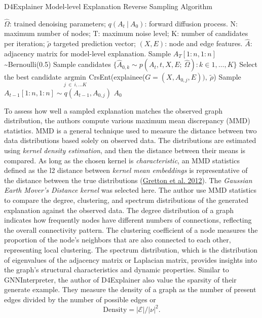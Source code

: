 \documentclass[
  11pt,
  letterpaper,
]{article}
\begin{document}
\begin{algorithm}
    \caption{D4Explainer Model-level Explanation Reverse Sampling Algorithm}\label{alg:cap}
    \begin{algorithmic}
        \Require $\hat \Omega$: trained denoising parameters; 
                $q(A_t \ | \ A_0)$: forward diffusion process.
        \renewcommand{\algorithmicrequire}{\textbf{Input:}}
        \renewcommand{\algorithmicensure}{\textbf{Output:}}
        \Require N: maximum number of nodes; T: maximum noise level; 
                K: number of candidates per iteration; 
                $\tilde{\rho}$ targeted prediction vector; 
                $(X, E)$: node and edge features.  
        \Ensure $\hat A$: adjacency matrix for model-level explanation.
        \State Sample $A_T[1:n, 1:n]$ \sim Bernoulli(0.5)
            \State Sample candidates 
                $\{\hat A_{0, k} \sim p(A_t,t, X, E; \ \hat \Omega) : k \in 1, \dots, K\}$
            \State Select the best candidate 
            $\underset{j \ \in \ i, \dots K}{\text{argmin}}$ 
            CrsEnt(explainee($G = (X, A_{0, j}, E)), \ \tilde{\rho}$)
            \State Sample $A_{t-1}[1:n, 1:n] \sim q(A_{t-1}, A_{0, j})$
        \EndFor
        \State \Return $A_0$
    \end{algorithmic}
    \end{algorithm}

\quad To assess how well a sampled explanation matches the observed
graph distribution, the authors compute various maximum mean discrepancy
(MMD) statistics. MMD is a general technique used to measure the
distance between two data distributions based solely on observed data.
The distributions are estimated using \emph{kernel density estimation},
and then the distance between their means is compared. As long as the
chosen kernel is \emph{characteristic}, an MMD statistics defined as the
l2 distance between \emph{kernel mean embeddings} is representative of
the distance between the true distributions
(\protect\hyperlink{ref-Gretton_Borgwardt_Rasch_Schuxf6lkopf_Smola_2012}{Gretton
et al. 2012}). The \emph{Gaussian Earth Mover's Distance kernel} was
selected here. The author use MMD statistics to compare the degree,
clustering, and spectrum distributions of the generated explanation
against the observed data. The degree distribution of a graph indicates
how frequently nodes have different numbers of connections, reflecting
the overall connectivity pattern. The clustering coefficient of a node
measures the proportion of the node's neighbors that are also connected
to each other, representing local clustering. The spectrum distribution,
which is the distribution of eigenvalues of the adjacency matrix or
Laplacian matrix, provides insights into the graph's structural
characteristics and dynamic properties. Similar to GNNInterpreter, the
author of D4Explainer also value the sparsity of their generate example.
They measure the density of a graph as the number of present edges
divided by the number of possible edges or \begin{equation}
        \text{Density} = \mathcal{|E|} / |\nu|^2. 
    \end{equation}
\end{document}
